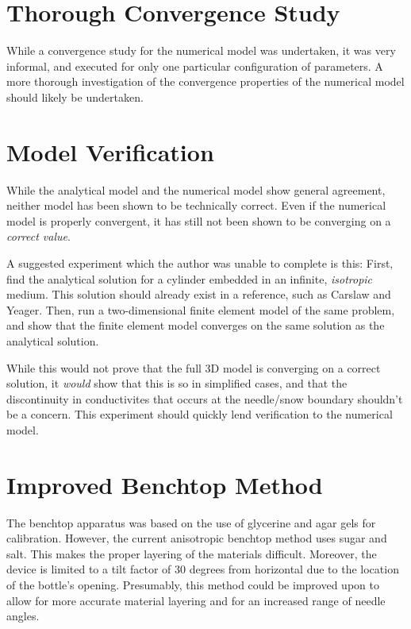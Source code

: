 \section{Thorough Convergence Study}

While a convergence study for the numerical model was undertaken, it was very
informal, and executed for only one particular configuration of parameters. A
more thorough investigation of the convergence properties of the numerical model
should likely be undertaken.

\section{Model Verification}

While the analytical model and the numerical model show general agreement,
neither model has been shown to be technically correct. Even if the numerical
model is properly convergent, it has still not been shown to be converging on
a \emph{correct value}.

A suggested experiment which the author was unable to complete is this: First,
find the analytical solution for a cylinder embedded in an infinite, 
\emph{isotropic} medium. This solution should already exist in a reference, such
as Carslaw and Yeager. Then, run a two-dimensional finite element model of the
same problem, and show that the finite element model converges on the same
solution as the analytical solution.

While this would not prove that the full 3D model is converging on a correct
solution, it \emph{would} show that this is so in simplified cases, and that the
discontinuity in conductivites that occurs at the needle/snow boundary shouldn't
be a concern. This experiment should quickly lend verification to the numerical
model.

\section{Improved Benchtop Method}

The benchtop apparatus was based on the use of glycerine and agar gels for
calibration. However, the current anisotropic benchtop method uses sugar and
salt. This makes the proper layering of the materials difficult. Moreover, the
device is limited to a tilt factor of \(30\) degrees from horizontal due to the
location of the bottle's opening. Presumably, this method could be improved upon
to allow for more accurate material layering and for an increased range of
needle angles.

